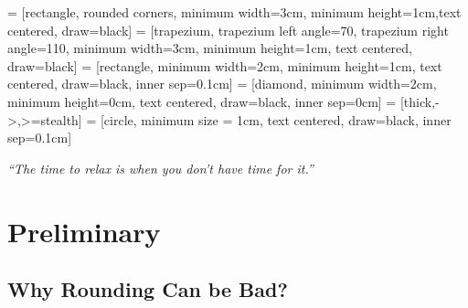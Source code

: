 
\usepackage{makecell}
\setlength{\parindent}{0pt}
\usepackage{float}

\usetikzlibrary{shapes.geometric, arrows}
     = [rectangle, rounded corners, minimum width=3cm, minimum height=1cm,text centered, draw=black]
     = [trapezium, trapezium left angle=70, trapezium right angle=110, minimum width=3cm, minimum height=1cm, text centered, draw=black]
     = [rectangle, minimum width=2cm, minimum height=1cm, text centered, draw=black, inner sep=0.1cm]
     = [diamond, minimum width=2cm, minimum height=0cm, text centered, draw=black, inner sep=0cm]
     = [thick,->,>=stealth]
     = [circle, minimum size = 1cm, text centered, draw=black, inner sep=0.1cm]

\renewcommand{\docTitle}{Lecture 3 - Branch and Bound}
\renewcommand{\docAuthor}{Lan Peng, Ph.D.}
\renewcommand{\docAffil}{School of Management, Shanghai University, Shanghai, China}

    \titleSec

    \begin{center}
        \textit{``The time to relax is when you don't have time for it.''}
    \end{center}

    \section{Preliminary}
        \subsection{Why Rounding Can be Bad?}
